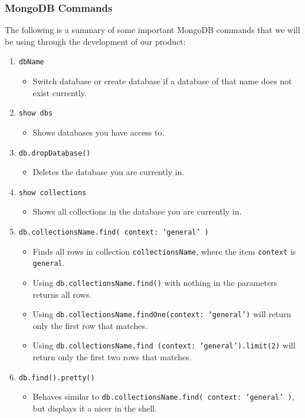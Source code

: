 \documentclass[titlepage, 12pt]{article}
\begin{document}
\subsubsection{MongoDB Commands}

The following is a summary of some important MongoDB commands that we will be using through the development of our product:

\begin{enumerate}
    \item \texttt{dbName}
    \begin{itemize}
        \item Switch database or create database if a database of that name does not exist currently.
    \end{itemize}
    \item \texttt{show dbs}
    \begin{itemize}
        \item Shows databases you have access to.
    \end{itemize}
    \item \texttt{db.dropDatabase()}
    \begin{itemize}
        \item Deletes the database you are currently in.
    \end{itemize}
    \item \texttt{show collections}
    \begin{itemize}
        \item Shows all collections in the database you are currently in.
    \end{itemize}
    \item \texttt{db.collectionsName.find({ context: 'general' })}
    \begin{itemize}
        \item Finds all rows in collection \texttt{collectionsName}, where the item \texttt{context} is \texttt{general}.
        \item Using \texttt{db.collectionsName.find()} with nothing in the parameters returns all rows.
        \item Using \texttt{db.collectionsName.findOne({context: ‘general’})} will return only the first row that matches.
        \item Using \texttt{db.collectionsName.find ({context: ‘general’}).limit(2)} will return only the first two rows that matches.
    \end{itemize}
    \item \texttt{db.find().pretty()}
    \begin{itemize}
        \item Behaves similar to \texttt{db.collectionsName.find({ context: 'general' })}, but displays it a nicer in the shell.
    \end{itemize}
    

\end{enumerate}
\end{document}
